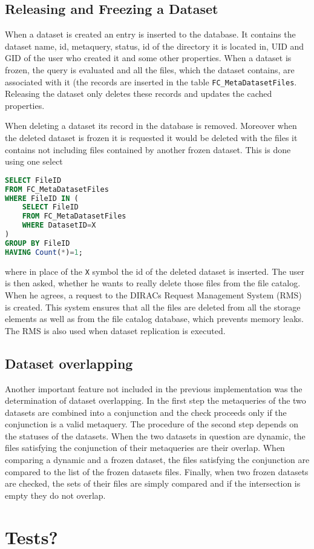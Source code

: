 \subsection{Releasing and Freezing a Dataset}

When a dataset is created an entry is inserted to the database. It contains the dataset name, id, metaquery, 
status, id of the directory it is located in, UID and GID of the user who created it and some other 
properties. When a dataset is frozen, the query is evaluated and all the files, which the
dataset contains, are associated with it (the records are inserted in the table \texttt{FC\_MetaDatasetFiles}.
Releasing the dataset only deletes these records and updates the cached properties. 

When deleting a dataset its record in the database is removed. Moreover when the deleted dataset is frozen
it is requested it would be deleted with the files it contains not including files contained by another frozen
dataset. This is done using one select

\begin{lstlisting}[language=sql]
SELECT FileID 
FROM FC_MetaDatasetFiles 
WHERE FileID IN (
	SELECT FileID 
	FROM FC_MetaDatasetFiles 
	WHERE DatasetID=X
) 
GROUP BY FileID 
HAVING Count(*)=1;
\end{lstlisting}

\noindent where in place of the \texttt{X} symbol the id of the deleted dataset is inserted. The user is then 
asked, whether he wants to really delete those files from the file catalog. When he agrees, a request to
the DIRACs Request Management System (RMS) is created. This system ensures that all the files
are deleted from all the storage elements as well as from the file catalog database, 
which prevents memory leaks. The RMS is also used when dataset replication is executed.

\subsection{Dataset overlapping}

Another important feature not included in the previous implementation was the determination of  
dataset overlapping. In the first step the metaqueries of the two datasets are combined
into a conjunction and the check proceeds only if the conjunction is a valid metaquery.
The procedure of the second step depends on the statuses of the datasets. When the two
datasets in question are dynamic, the files satisfying the conjunction of their metaqueries
are their overlap. When comparing a dynamic and a frozen dataset, the files satisfying 
the conjunction are compared to the list of the frozen datasets files. Finally, when 
two frozen datasets are checked, the sets of their files are simply compared and if 
the intersection is empty they do not overlap.


\section{Tests?}
